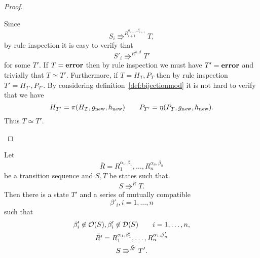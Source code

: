 \begin{proof}
\begin{description}
      Since
      \begin{equation}
        S_i \Rrightarrow^{R_{i+1}^{\alpha_{i+1}, \beta_{i+1}}} T,
      \end{equation}
      by rule inspection it is easy to verify that
      \begin{equation}
        S'_i \Rrightarrow^{R^{\alpha, \beta}} T'
      \end{equation}
      for some $T'$. If $T = \mbox{{\bf error}}$ then by rule inspection we must have $T' =
      \mbox{{\bf error}}$ and trivially that $T \simeq T'$. Furthermore, if $T = H_{T},
      P_{T}$ then by rule inspection $T' = H_{T'}, P_{T'}$. By considering
      definition~\ref{def:bijectionmod} it is not hard to verify that
      we have
      \begin{equation*}
        H_{T'} = \pi(H_T, g_{\text{new}}, h_{\text{new}}) \quad\quad P_{T'} =
        \eta(P_T, g_{\text{new}}, h_{\text{new}}).
      \end{equation*}
      Thus $T \simeq T'$.
  \end{description}
\end{proof}

\begin{lemma} \label{lem:lemma4}
  Let 
  \begin{equation*}
    \bar{R} = R_1^{\alpha_1, \beta_1}, \dots, R_n^{\alpha_n, \beta_n}
  \end{equation*}
  be a transition sequence and $S, T$ be states such that.
  \begin{equation*}
    S \Rrightarrow^{\bar{R}} T.
  \end{equation*}
  Then there is a state $T'$ and a series of mutually compatible 
  \begin{equation*}
    \beta'_i, i = 1, \dots, n
  \end{equation*}
  such that
  \begin{equation*}
    \begin{gathered}
      \beta'_i \not\in \mathcal{O}(S), \beta'_i \not\in \mathcal{D}(S) \quad\quad i =
      1, \dots, n, \\
      \bar{R'} = R_1^{\alpha_1, \beta'_1}, \dots, R_n^{\alpha_1, \beta'_n} \\
      S \Rrightarrow^{\bar{R'}} T'.
    \end{gathered}
  \end{equation*}
\end{lemma}

